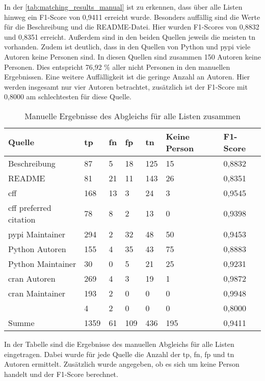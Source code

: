 In der \autoref{tab:matching_results_manual} ist zu erkennen, dass über alle Listen hinweg ein F1-Score von 0,9411 erreicht wurde.
Besonders auffällig sind die Werte für die Beschreibung und die README-Datei.
Hier wurden F1-Scores von 0,8832 und 0,8351 erreicht.
Außerdem sind in den beiden Quellen jeweils die meisten \gls{tn} vorhanden.
Zudem ist deutlich, dass in den Quellen von Python und \gls{pypi} viele Autoren keine Personen sind.
In diesen Quellen sind zusammen 150 Autoren keine Personen.
Dies entspricht 76,92 \% aller nicht Personen in den manuellen Ergebnissen.
Eine weitere Auffälligkeit ist die geringe Anzahl an  Autoren.
Hier werden insgesamt nur vier Autoren betrachtet, zusätzlich ist der F1-Score mit 0,8000 am schlechtesten für diese Quelle.

\begin{table}
    \begin{tabularx}{\textwidth}{XR{.8cm}R{.8cm}R{.8cm}R{.8cm}R{2.8cm}R{2cm}}
        \toprule
        \textbf{Quelle} & \textbf{\gls{tp}} & \textbf{\gls{fn}} & \textbf{\gls{fp}} & \textbf{\gls{tn}} & \textbf{Keine Person} & \textbf{F1-Score} \\ \midrule
        Beschreibung                 & 87   & 5  & 18  & 125 & 15  & 0,8832 \\
        README                       & 81   & 21 & 11  & 143 & 26  & 0,8351 \\
        \gls{cff}                    & 168  & 13 & 3   & 24  & 3   & 0,9545 \\
        \gls{cff} preferred citation & 78   & 8  & 2   & 13  & 0   & 0,9398 \\
        \gls{pypi} Maintainer        & 294  & 2  & 32  & 48  & 50  & 0,9453 \\
        Python Autoren               & 155  & 4  & 35  & 43  & 75  & 0,8883 \\
        Python Maintainer            & 30   & 0  & 5   & 21  & 25  & 0,9231 \\
        \gls{cran} Autoren           & 269  & 4  & 3   & 19  & 1   & 0,9872 \\
        \gls{cran} Maintainer        & 193  & 2  & 0   & 0   & 0   & 0,9948 \\
                      & 4    & 2  & 0   & 0   & 0   & 0,8000 \\ \midrule
        Summe                        & 1359 & 61 & 109 & 436 & 195 & 0,9411 \\
        \bottomrule
    \end{tabularx}
    \caption{Manuelle Ergebnisse des Abgleichs für alle Listen zusammen}
    \label{tab:matching_results_manual}
    \small
    In der Tabelle sind die Ergebnisse des manuellen Abgleichs für alle Listen eingetragen. Dabei wurde für jede Quelle die Anzahl der \gls{tp}, \gls{fn}, \gls{fp} und \gls{tn} Autoren ermittelt. Zusätzlich wurde angegeben, ob es sich um keine Person handelt und der F1-Score berechnet.
\end{table}

